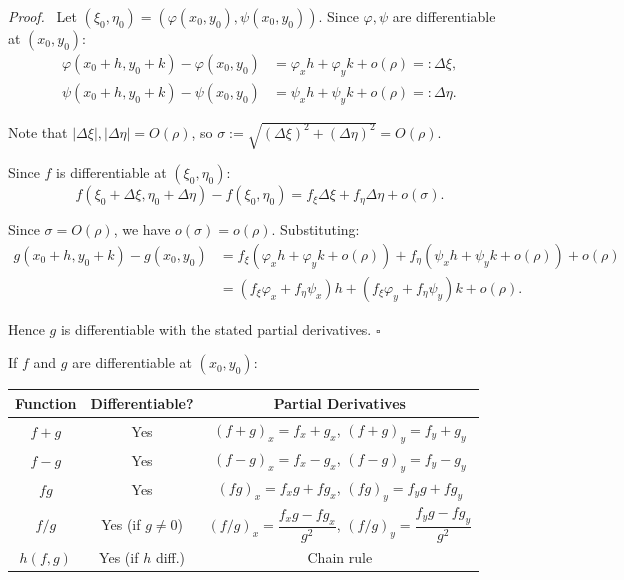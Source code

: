 \documentclass[11pt]{report}
\renewenvironment{proof}[1][Proof]{\par\noindent\textit{#1.}\ }{\hfill$\square$\par\medskip}
\begin{document}
\begin{proof}
Let $(\xi_0, \eta_0) = (\varphi(x_0, y_0), \psi(x_0, y_0))$. Since $\varphi, \psi$ are differentiable at $(x_0, y_0)$:
\begin{align*}
\varphi(x_0 + h, y_0 + k) - \varphi(x_0, y_0) &= \varphi_x h + \varphi_y k + o(\rho) =: \Delta\xi, \\
\psi(x_0 + h, y_0 + k) - \psi(x_0, y_0) &= \psi_x h + \psi_y k + o(\rho) =: \Delta\eta.
\end{align*}

Note that $|\Delta\xi|, |\Delta\eta| = O(\rho)$, so $\sigma := \sqrt{(\Delta\xi)^2 + (\Delta\eta)^2} = O(\rho)$.

Since $f$ is differentiable at $(\xi_0, \eta_0)$:
\[
f(\xi_0 + \Delta\xi, \eta_0 + \Delta\eta) - f(\xi_0, \eta_0) = f_\xi \Delta\xi + f_\eta \Delta\eta + o(\sigma).
\]

Since $\sigma = O(\rho)$, we have $o(\sigma) = o(\rho)$. Substituting:
\begin{align*}
g(x_0 + h, y_0 + k) - g(x_0, y_0) &= f_\xi (\varphi_x h + \varphi_y k + o(\rho)) + f_\eta (\psi_x h + \psi_y k + o(\rho)) + o(\rho) \\
&= (f_\xi \varphi_x + f_\eta \psi_x) h + (f_\xi \varphi_y + f_\eta \psi_y) k + o(\rho).
\end{align*}

Hence $g$ is differentiable with the stated partial derivatives.
\end{proof}

\begin{remark}
If $f$ and $g$ are differentiable at $(x_0, y_0)$:
\begin{center}
\begin{tabular}{|c|c|c|}
\hline
\textbf{Function} & \textbf{Differentiable?} & \textbf{Partial Derivatives} \\
\hline
$f + g$ & Yes & $(f+g)_x = f_x + g_x$, \; $(f+g)_y = f_y + g_y$ \\
\hline
$f - g$ & Yes & $(f-g)_x = f_x - g_x$, \; $(f-g)_y = f_y - g_y$ \\
\hline
$fg$ & Yes & $(fg)_x = f_x g + f g_x$, \; $(fg)_y = f_y g + f g_y$ \\
\hline
$f/g$ & Yes (if $g \neq 0$) & $(f/g)_x = \dfrac{f_x g - f g_x}{g^2}$, \; $(f/g)_y = \dfrac{f_y g - f g_y}{g^2}$ \\
\hline
$h(f, g)$ & Yes (if $h$ diff.) & Chain rule \\
\hline
\end{tabular}
\end{center}
\end{remark}
\end{document}
